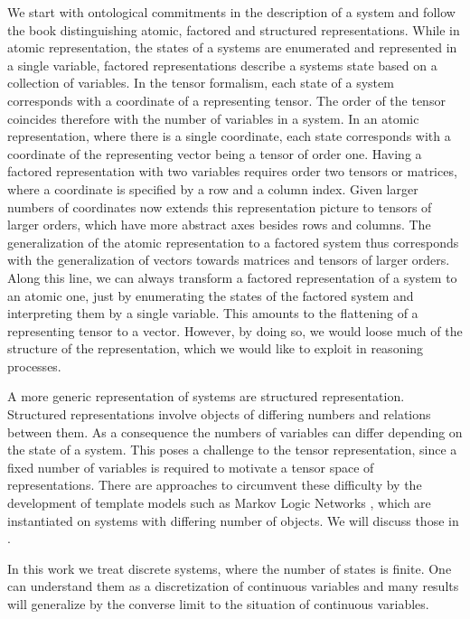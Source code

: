 
We start with ontological commitments in the description of a system and follow the book \cite{russell_artificial_2021} distinguishing atomic, factored and structured representations.
While in atomic representation, the states of a systems are enumerated and represented in a single variable, factored representations describe a systems state based on a collection of variables.
In the tensor formalism, each state of a system corresponds with a coordinate of a representing tensor.
The order of the tensor coincides therefore with the number of variables in a system.
In an atomic representation, where there is a single coordinate, each state corresponds with a coordinate of the representing vector being a tensor of order one.
Having a factored representation with two variables requires order two tensors or matrices, where a coordinate is specified by a row and a column index.
Given larger numbers of coordinates now extends this representation picture to tensors of larger orders, which have more abstract axes besides rows and columns.
The generalization of the atomic representation to a factored system thus corresponds with the generalization of vectors towards matrices and tensors of larger orders.
Along this line, we can always transform a factored representation of a system to an atomic one, just by enumerating the states of the factored system and interpreting them by a single variable.
This amounts to the flattening of a representing tensor to a vector.
However, by doing so, we would loose much of the structure of the representation, which we would like to exploit in reasoning processes.

A more generic representation of systems are structured representation.
Structured representations involve objects of differing numbers and relations between them.
As a consequence the numbers of variables can differ depending on the state of a system.
This poses a challenge to the tensor representation, since a fixed number of variables is required to motivate a tensor space of representations.
There are approaches to circumvent these difficulty by the development of template models such as Markov Logic Networks \cite{richardson_markov_2006}, which are instantiated on systems with differing number of objects.
We will discuss those in .

In this work we treat discrete systems, where the number of states is finite.
One can understand them as a discretization of continuous variables and many results will generalize by the converse limit to the situation of continuous variables.

